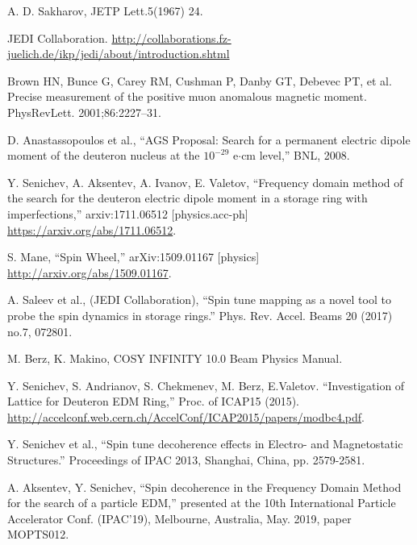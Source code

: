 \documentclass[preprint, review]{elsarticle}
\begin{document}
\begin{thebibliography}{9}

  A. D. Sakharov, JETP Lett.5(1967) 24.

  JEDI Collaboration. \url{http://collaborations.fz-juelich.de/ikp/jedi/about/introduction.shtml}

  Brown HN, Bunce G, Carey RM, Cushman P, Danby GT, Debevec PT, et al.
  Precise measurement of the positive muon anomalous magnetic moment. PhysRevLett. 2001;86:2227–31. 

  
  D. Anastassopoulos et al., ``AGS Proposal: Search for a permanent electric dipole moment of
  the deuteron nucleus at the $10^{-29}$ e$\cdot$cm level,'' BNL, 2008.

  Y. Senichev, A. Aksentev, A. Ivanov, E. Valetov, ``Frequency domain method of the search for
  the deuteron electric dipole moment in a storage ring with imperfections,'' arxiv:1711.06512 [physics.acc-ph]
  \url{https://arxiv.org/abs/1711.06512}.

  S. Mane, ``Spin Wheel,'' arXiv:1509.01167 [physics]
  \url{http://arxiv.org/abs/1509.01167}.

  A. Saleev et al., (JEDI Collaboration), ``Spin tune mapping as a novel tool to probe
  the spin dynamics in storage rings.'' Phys. Rev. Accel. Beams 20 (2017) no.7, 072801.

  M. Berz, K. Makino, COSY INFINITY 10.0 Beam Physics Manual.

  Y. Senichev, S. Andrianov, S. Chekmenev, M. Berz, E.Valetov. ``Investigation of Lattice for Deuteron EDM Ring,''
  Proc. of ICAP15 (2015). \url{http://accelconf.web.cern.ch/AccelConf/ICAP2015/papers/modbc4.pdf}.

  
  Y. Senichev et al., ``Spin tune decoherence effects in Electro- and Magnetostatic Structures.''
  Proceedings of IPAC 2013, Shanghai, China, pp. 2579-2581.

  A. Aksentev, Y. Senichev, ``Spin decoherence in the Frequency Domain Method for the search of a particle EDM,''
  presented at the 10th International Particle Accelerator Conf. (IPAC'19), Melbourne, Australia,
  May. 2019, paper MOPTS012.



\end{thebibliography}
\end{document}
